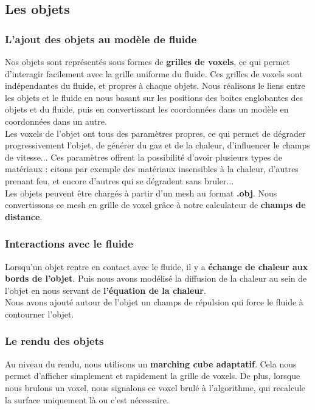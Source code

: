 \documentclass[a4paper,10pt]{article}
\begin{document}
\subsection{Les objets}
\subsubsection{L'ajout des objets au modèle de fluide}
Nos objets sont représentés sous formes de \textbf{grilles de voxels}, ce qui 
permet d'interagir facilement avec la grille uniforme du fluide.
Ces grilles de voxels sont indépendantes du fluide, et propres à chaque objets.
Nous réalisons le liens entre les objets et le fluide en nous basant 
sur les positions des boites englobantes des objets et du fluide,
puis en convertissant les coordonnées dans un modèle en coordonnées dans un autre.\\
Les voxels de l'objet ont tous des paramètres propres, ce qui permet
de dégrader progressivement l'objet, de générer du gaz et de la chaleur,
d'influencer le champs de vitesse... Ces paramètres offrent la possibilité d'avoir
plusieurs types de matériaux : citons par exemple des matériaux insensibles à
la chaleur, d'autres prenant feu, et encore d'autres qui se dégradent sans bruler...\\

Les objets peuvent être chargés à partir d'un mesh au format \textbf{.obj}. 
Nous convertissons ce mesh en grille de voxel grâce à notre calculateur de 
\textbf{champs de distance}.

\subsubsection{Interactions avec le fluide}
Lorsqu'un objet rentre en contact avec le fluide, il y a \textbf{échange de chaleur aux
bords de l'objet}. Puis nous avons modélisé la diffusion de la chaleur au sein
de l'objet en nous servant de \textbf{l'équation de la chaleur}.\\
Nous avons ajouté autour de l'objet un champs de répulsion qui force le fluide
à contourner l'objet.

\subsubsection{Le rendu des objets}
Au niveau du rendu, nous utilisons un \textbf{marching cube adaptatif}. Cela nous permet
d'afficher simplement et rapidement la grille de voxels. De plus, lorsque nous brulons un voxel,
nous signalons ce voxel brulé à l'algorithme, qui recalcule la surface uniquement 
là ou c'est nécessaire.
\end{document}
